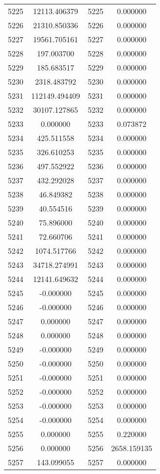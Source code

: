 \documentclass[12pt]{article}
\begin{document}
\begin{longtable}{@{}cccc@{}}
5225 & 12113.406379 & 5225 & 0.000000 \\
5226 & 21310.850336 & 5226 & 0.000000 \\
5227 & 19561.705161 & 5227 & 0.000000 \\
5228 & 197.003700 & 5228 & 0.000000 \\
5229 & 185.683517 & 5229 & 0.000000 \\
5230 & 2318.483792 & 5230 & 0.000000 \\
5231 & 112149.494409 & 5231 & 0.000000 \\
5232 & 30107.127865 & 5232 & 0.000000 \\
5233 & 0.000000 & 5233 & 0.073872 \\
5234 & 425.511558 & 5234 & 0.000000 \\
5235 & 326.610253 & 5235 & 0.000000 \\
5236 & 497.552922 & 5236 & 0.000000 \\
5237 & 432.292028 & 5237 & 0.000000 \\
5238 & 46.849382 & 5238 & 0.000000 \\
5239 & 40.554516 & 5239 & 0.000000 \\
5240 & 75.896000 & 5240 & 0.000000 \\
5241 & 72.660706 & 5241 & 0.000000 \\
5242 & 1074.517766 & 5242 & 0.000000 \\
5243 & 34718.274991 & 5243 & 0.000000 \\
5244 & 12141.649632 & 5244 & 0.000000 \\
5245 & -0.000000 & 5245 & 0.000000 \\
5246 & -0.000000 & 5246 & 0.000000 \\
5247 & 0.000000 & 5247 & 0.000000 \\
5248 & 0.000000 & 5248 & 0.000000 \\
5249 & -0.000000 & 5249 & 0.000000 \\
5250 & -0.000000 & 5250 & 0.000000 \\
5251 & -0.000000 & 5251 & 0.000000 \\
5252 & -0.000000 & 5252 & 0.000000 \\
5253 & -0.000000 & 5253 & 0.000000 \\
5254 & -0.000000 & 5254 & 0.000000 \\
5255 & 0.000000 & 5255 & 0.220000 \\
5256 & 0.000000 & 5256 & 2658.159135 \\
5257 & 143.099055 & 5257 & 0.000000 \\

\end{longtable}
\end{document}
